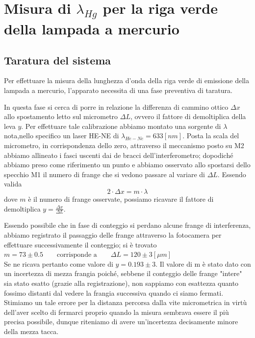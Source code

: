 \section{Misura di $\lambda_{Hg}$ per la riga verde della lampada a mercurio}
\subsection{Taratura del sistema}
Per effettuare la misura della lunghezza d'onda 
della riga verde di emissione della lampada
a mercurio, l'apparato necessita di una fase 
preventiva di taratura.

In questa fase si cerca di porre in relazione la differenza 
di cammino ottico $\Delta x$ allo spostamento letto 
sul micrometro $\Delta L$,
ovvero il fattore di demoltiplica della leva $y$.
Per effettuare tale calibrazione abbiamo 
montato una sorgente di  $\lambda$ nota,nello specifico un laser
HE-NE di $\lambda_{He-Ne}=633 [nm]$.
Posta la scala del micrometro, in corrispondenza dello zero,
attraverso il meccanismo posto su M2 abbiamo allineato i fasci 
uscenti dai de bracci dell'interferometro;
dopodiché abbiamo preso 
come riferimento un punto e abbiamo osservato allo spostarsi dello 
specchio M1 il numero di frange che si vedono 
passare al variare di $\Delta L$.
Essendo valida \smallskip
\begin{equation}\label{eq:lambda}
2 \cdot \Delta x = m \cdot \lambda
 \end{equation}
 \smallskip
dove $m$ è il numero di frange osservate, possiamo ricavare 
il fattore di demoltiplica $y=\frac{\Delta x}{\Delta L}$.

Essendo possibile che in fase di conteggio si perdano 
alcune frange di interferenza, abbiamo registrato il passaggio delle frange attraverso la fotocamera 
per effettuare successivamente il conteggio; si è trovato\\
$m=73 \pm 0.5 \qquad \text{corrisponde a}\qquad \Delta L =120\pm 3 [\mu m]$
\\
Se ne ricava pertanto come valore di $y= 0.193	\pm	3$.
Il valore di m è stato dato con un incertezza di mezza frangia poiché, sebbene il conteggio delle frange "intere" sia stato esatto (grazie alla registrazione), non sappiamo con esattezza quanto fossimo distanti dal vedere la frangia successiva quando ci siamo fermati.
Stimiamo un tale errore per la distanza percorsa dalla vite micrometrica 
in virtù dell'aver scelto di fermarci proprio quando la misura sembrava essere il più precisa possibile,
dunque riteniamo di avere un'incertezza decisamente minore della mezza tacca.
